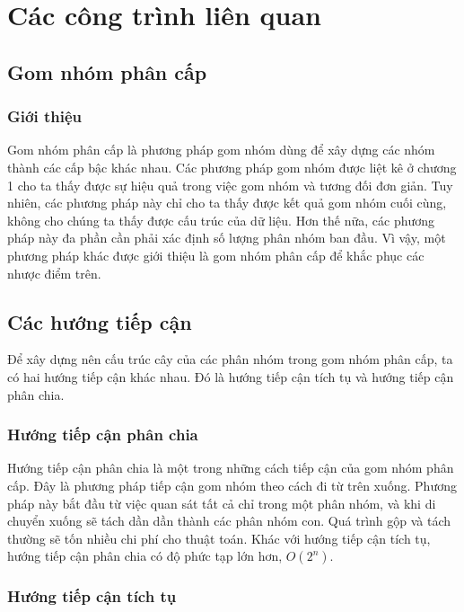\chapter{Các công trình liên quan}
\label{Chapter2}

\section{Gom nhóm phân cấp}
\subsection{Giới thiệu}
Gom nhóm phân cấp là phương pháp gom nhóm dùng để xây dựng các nhóm thành các cấp bậc khác nhau.
Các phương pháp gom nhóm được liệt kê ở chương 1 cho ta thấy được sự hiệu quả trong việc gom nhóm và tương đối đơn giản.
Tuy nhiên, các phương pháp này chỉ cho ta thấy được kết quả gom nhóm cuối cùng, không cho chúng ta thấy được cấu trúc của dữ liệu.
Hơn thế nữa, các phương pháp này đa phần cần phải xác định số lượng phân nhóm ban đầu.
Vì vậy, một phương pháp khác được giới thiệu là gom nhóm phân cấp để khắc phục các nhược điểm trên.

\section{Các hướng tiếp cận}
Để xây dựng nên cấu trúc cây của các phân nhóm trong gom nhóm phân cấp, ta có hai hướng tiếp cận khác nhau. Đó là hướng tiếp cận tích tụ và hướng tiếp cận phân chia.

\subsection{Hướng tiếp cận phân chia}
Hướng tiếp cận phân chia là một trong những cách tiếp cận của gom nhóm phân cấp.
Đây là phương pháp tiếp cận gom nhóm theo cách đi từ trên xuống.
Phương pháp này bắt đầu từ việc quan sát tất cả chỉ trong một phân nhóm, và khi di chuyển xuống sẽ tách dần dần thành các phân nhóm con.
Quá trình gộp và tách thường sẽ tốn nhiều chi phí cho thuật toán.
Khác với hướng tiếp cận tích tụ, hướng tiếp cận phân chia có độ phức tạp lớn hơn, $O(2^n)$.
		
		
\subsection{Hướng tiếp cận tích tụ}
